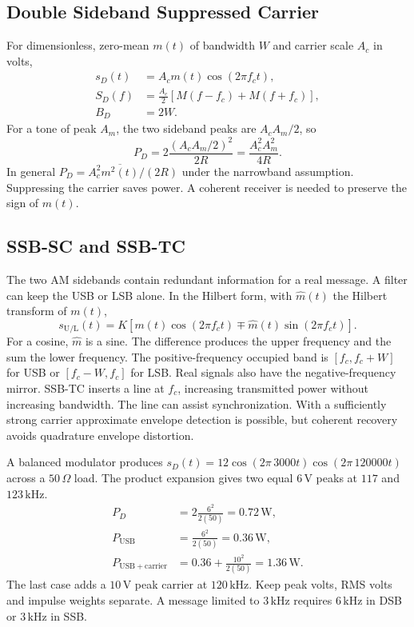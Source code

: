 \documentclass[12pt,a4paper]{article}
\begin{document}
\subsection{Double Sideband Suppressed Carrier}
For dimensionless, zero-mean $m(t)$ of bandwidth $W$ and carrier scale $A_c$ in volts,
\[
\begin{aligned}
 s_D(t)&=A_c m(t)\cos(2\pi f_ct),\\
 S_D(f)&=\frac{A_c}{2}[M(f-f_c)+M(f+f_c)],\\
 B_D&=2W.
\end{aligned}
\]
For a tone of peak $A_m$, the two sideband peaks are $A_cA_m/2$, so
\[
 P_D=2\frac{(A_cA_m/2)^2}{2R}=\frac{A_c^2 A_m^2}{4R}.
\]
In general $P_D=A_c^2\overline{m^2(t)}/(2R)$ under the narrowband assumption. Suppressing the carrier saves power. A coherent receiver is needed to preserve the sign of $m(t)$.

\subsection{SSB-SC and SSB-TC}
The two AM sidebands contain redundant information for a real message. A filter can keep the USB or LSB alone. In the Hilbert form, with $\widehat m(t)$ the Hilbert transform of $m(t)$,
\[
 s_{\mathrm{U/L}}(t)=K[m(t)\cos(2\pi f_ct)\mp\widehat m(t)\sin(2\pi f_ct)].
\]
For a cosine, $\widehat m$ is a sine. The difference produces the upper frequency and the sum the lower frequency. The positive-frequency occupied band is $[f_c,f_c+W]$ for USB or $[f_c-W,f_c]$ for LSB. Real signals also have the negative-frequency mirror. SSB-TC inserts a line at $f_c$, increasing transmitted power without increasing bandwidth. The line can assist synchronization. With a sufficiently strong carrier approximate envelope detection is possible, but coherent recovery avoids quadrature envelope distortion.

\begin{tcolorbox}[examplebox, title={Compare DSB-SC and Filtered SSB for the Same Tone}]
A balanced modulator produces $s_D(t)=12\cos(2\pi\,3000t)\cos(2\pi\,120000t)$ across a $50\,\Omega$ load. The product expansion gives two equal $6\,\mathrm V$ peaks at $117$ and $123\,\mathrm{kHz}$.
\[
 \begin{aligned}
 P_D&=2\frac{6^2}{2(50)}=0.72\,\mathrm W,\\
 P_{\mathrm{USB}}&=\frac{6^2}{2(50)}=0.36\,\mathrm W,\\
 P_{\mathrm{USB+carrier}}&=0.36+\frac{10^2}{2(50)}
                      =1.36\,\mathrm W.
 \end{aligned}
\]
The last case adds a $10\,\mathrm V$ peak carrier at $120\,\mathrm{kHz}$. Keep peak volts, RMS volts and impulse weights separate. A message limited to $3\,\mathrm{kHz}$ requires $6\,\mathrm{kHz}$ in DSB or $3\,\mathrm{kHz}$ in SSB.
\end{tcolorbox}
\end{document}
